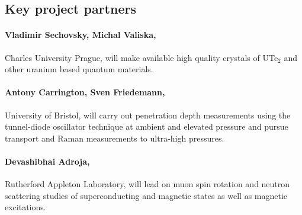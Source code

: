 \subsection*{Key project partners} 

\paragraph{Vladimir Sechovsky, Michal Valiska,} Charles University Prague, will make available high quality crystals of UTe$_2$ and other uranium based quantum materials.

\paragraph{Antony Carrington, Sven Friedemann,} University of Bristol, will carry out penetration depth measurements using the tunnel-diode oscillator technique at ambient and elevated pressure and pursue transport and Raman measurements to ultra-high pressures.%

\paragraph{Devashibhai Adroja,} Rutherford Appleton Laboratory, will lead on muon spin rotation and neutron scattering studies of superconducting and magnetic states as well as magnetic excitations.




